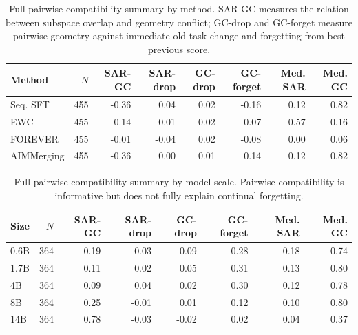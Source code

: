 \documentclass{article}
\begin{document}
\begin{table}[!htbp]
  \centering
  \caption{
  {Full pairwise compatibility summary by method.}
  SAR-GC measures the relation between subspace overlap and geometry conflict; GC-drop and GC-forget measure pairwise geometry against immediate old-task change and forgetting from best previous score.
  }
  \label{tab:app_pairwise_method_full}
  \scriptsize
  \setlength{\tabcolsep}{4pt}
{
\renewcommand{\arraystretch}{1.08}
\begin{tabular}{lrrrrrrr}
\toprule[0.9pt]
\rowcolor{sizeBand}
Method & $N$ & SAR-GC & SAR-drop & GC-drop & GC-forget & Med. SAR & Med. GC \\
\midrule
\rowcolor{refGray} Seq. SFT & 455 & -0.36 & 0.04 & 0.02 & -0.16 & 0.12 & 0.82 \\
\rowcolor{refGray} EWC & 455 & 0.14 & 0.01 & 0.02 & -0.07 & 0.57 & 0.16 \\
\rowcolor{refGray} FOREVER & 455 & -0.01 & -0.04 & 0.02 & -0.08 & 0.00 & 0.06 \\
\rowcolor{mergeBlue} AIMMerging & 455 & -0.36 & 0.00 & 0.01 & 0.14 & 0.12 & 0.82 \\
\bottomrule[0.9pt]
\end{tabular}
}

\end{table}

\begin{table}[!htbp]
  \centering
  \caption{
  {Full pairwise compatibility summary by model scale.}
  Pairwise compatibility is informative but does not fully explain continual forgetting.
  }
  \label{tab:app_pairwise_size_full}
  \scriptsize
  \setlength{\tabcolsep}{4pt}
{
\renewcommand{\arraystretch}{1.08}
\begin{tabular}{lrrrrrrr}
\toprule[0.9pt]
\rowcolor{sizeBand}
Size & $N$ & SAR-GC & SAR-drop & GC-drop & GC-forget & Med. SAR & Med. GC \\
\midrule
\rowcolor{refGray} 0.6B & 364 & 0.19 & 0.03 & 0.09 & 0.28 & 0.18 & 0.74 \\
\rowcolor{mergeBlue} 1.7B & 364 & 0.11 & 0.02 & 0.05 & 0.31 & 0.13 & 0.80 \\
\rowcolor{refGray} 4B & 364 & 0.09 & 0.04 & 0.02 & 0.30 & 0.12 & 0.78 \\
\rowcolor{mergeBlue} 8B & 364 & 0.25 & -0.01 & 0.01 & 0.12 & 0.10 & 0.80 \\
\rowcolor{refGray} 14B & 364 & 0.78 & -0.03 & -0.02 & 0.02 & 0.04 & 0.37 \\
\bottomrule[0.9pt]
\end{tabular}
}

\end{table}
\end{document}
